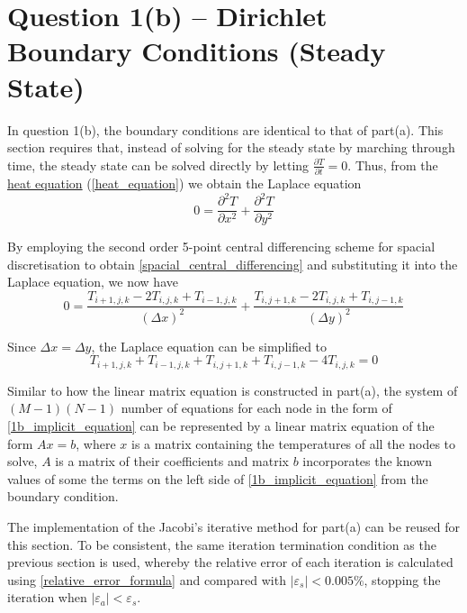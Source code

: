 \documentclass[a4paper]{article}
\begin{document}
\section{Question 1(b) -- Dirichlet Boundary Conditions (Steady State)}
	In question 1(b), the boundary conditions are identical to that of part(a). This section requires that, instead of solving for the steady state by marching through time, the steady state can be solved directly by letting $\displaystyle{\frac{\partial T}{\partial t} = 0}$. Thus, from the \hyperref[heat_equation]{heat equation} (\autoref{heat_equation}) we obtain the Laplace equation
	\begin{equation*}
		0 = \frac{\partial^2 T}{\partial x^2} + \frac{\partial^2 T}{\partial y^2}
	\end{equation*}
	
	By employing the second order 5-point central differencing scheme for spacial discretisation to obtain \autoref{spacial_central_differencing} and substituting it into the Laplace equation, we now have
	\begin{equation}
		0 =
		\frac{T_{i+1,j,k} - 2T_{i,j,k} + T_{i-1,j,k}}{(\Delta x)^2}
		+ 
		\frac{T_{i,j+1,k} - 2T_{i,j,k} + T_{i,j-1,k}}{(\Delta y)^2}
		\label{laplace_equation_2}
	\end{equation}

	Since $\Delta x = \Delta y$, the Laplace equation can be simplified to
	\begin{equation*}
		T_{i+1,j,k} + T_{i-1,j,k}
		+ T_{i,j+1,k} + T_{i,j-1,k}
		- 4T_{i,j,k} = 0
		\label{1b_implicit_equation}
	\end{equation*}
	
	Similar to how the linear matrix equation is constructed in part(a), the system of $(M-1)(N-1)$ number of equations for each node in the form of \autoref{1b_implicit_equation} can be represented by a linear matrix equation of the form $Ax=b$, where $x$ is a matrix containing the temperatures of all the nodes to solve, $A$ is a matrix of their coefficients and matrix $b$ incorporates the known values of some the terms on the left side of \autoref{1b_implicit_equation} from the boundary condition.
	
	The implementation of the Jacobi's iterative method for part(a) can be reused for this section. To be consistent, the same iteration termination condition as the previous section is used, whereby the relative error of each iteration is calculated using \autoref{relative_error_formula} and compared with $\vert \varepsilon_s \vert < 0.005\%$, stopping the iteration when $\vert \varepsilon_a \vert < \varepsilon_s$.
	
\end{document}
